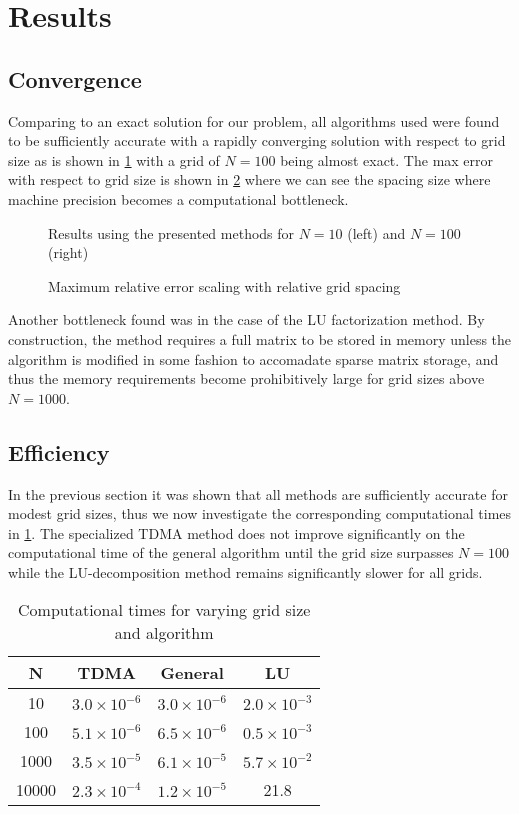 \documentclass[10pt, a4paper]{amsart}
\begin{document}
\section{Results}


\subsection{Convergence}
Comparing to an exact solution for our problem, all algorithms used were found to be sufficiently accurate with a rapidly converging solution with respect to grid size as is shown in \ref{fig:n10} with a grid of $N=100$ being almost exact. The max error with respect to grid size is shown in \ref{fig:error} where we can see the spacing size where machine precision becomes a computational bottleneck.


\begin{figure}%
    \centering
    \subfloat[N=10]{\resizebox{0.45\textwidth}{!}{ }}%
    \qquad
    \subfloat[N=100]{\resizebox{0.45\textwidth}{!}{ }}%
    \caption{Results using the presented methods for $N=10$ (left) and $N=100$ (right)}
    \label{fig:n10}%
\end{figure}

\begin{figure}[t]
  \centering
  
  \caption{Maximum relative error scaling with relative grid spacing }
  \label{fig:error}
\end{figure}
Another bottleneck found was in the case of the LU factorization method. By construction, the method requires a full matrix to be stored in memory unless the algorithm is modified in some fashion to accomadate sparse matrix storage, and thus the memory requirements become prohibitively large for grid sizes above $N=1000$. 
\subsection{Efficiency}
In the previous section it was shown that all methods are sufficiently accurate for modest grid sizes, thus we now investigate the corresponding computational times in \ref{table:time}. The specialized TDMA method does not improve significantly on the computational time of the general algorithm until the grid size surpasses $N=100$ while the LU-decomposition method remains significantly slower for all grids.  
\begin{table}[t]
\centering
\begin{tabular}{|c|c|c|c|}
	\hline
	N & TDMA & General & LU \\\hline 
	10 & $3.0\times10^{-6} $& $3.0\times10^{-6}$ & $2.0\times10^{-3}$\\
	100 & $5.1\times10^{-6} $& $6.5\times10^{-6}$ & $0.5\times10^{-3} $\\
	1000 & $3.5\times10^{-5}$ & $6.1\times10^{-5}$ & $5.7\times10^{-2}$\\
	10000 & $2.3\times10^{-4}$ & $1.2\times10^{-5}$ & 21.8\\\hline
\end{tabular}
  \caption{Computational times for varying grid size and algorithm}
	\label{table:time}
\end{table}
\end{document}
